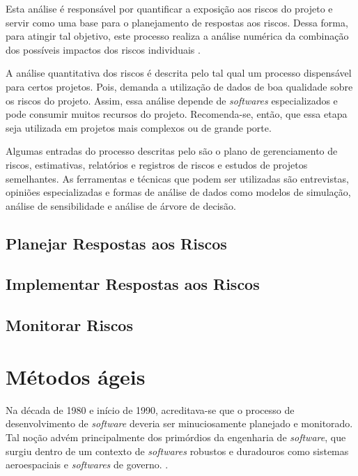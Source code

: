 \documentclass[
    12pt,       %
    openright,      %
    twoside,      %
    a4paper,      %
    english,      %
    french,       %
    spanish,      %
    brazil,       %
    ]{abntex2}
\begin{document}
Esta análise é responsável por quantificar a exposição aos riscos do projeto e servir como uma base para o planejamento de respostas aos riscos. Dessa forma, para atingir tal objetivo, este processo realiza a análise numérica da combinação dos possíveis impactos dos riscos individuais \cite{PMBOK:2017}.

A análise quantitativa dos riscos é descrita pelo  tal qual um processo dispensável para certos projetos. Pois, demanda a utilização de dados de boa qualidade sobre os riscos do projeto. Assim, essa análise depende de \textit{softwares} especializados e pode consumir muitos recursos do projeto. Recomenda-se, então, que essa etapa seja utilizada em projetos mais complexos ou de grande porte. 

Algumas entradas do processo descritas pelo 
são o plano de gerenciamento de riscos, estimativas, relatórios e registros de riscos e estudos de projetos semelhantes. As ferramentas e técnicas que podem ser utilizadas são entrevistas, opiniões especializadas e formas de análise de dados como modelos de simulação, análise de sensibilidade e análise de árvore de decisão. 

\subsection{Planejar Respostas aos Riscos}



\subsection{Implementar Respostas aos Riscos}
\subsection{Monitorar Riscos}

\section{Métodos ágeis}

Na década de 1980 e início de 1990, acreditava-se que o processo de desenvolvimento de \textit{software} deveria ser minuciosamente planejado e monitorado. Tal noção advém principalmente dos primórdios da engenharia de \textit{software}, que surgiu dentro de um contexto de \textit{softwares} robustos e duradouros como sistemas aeroespaciais e \textit{softwares} de governo. \cite{SOMMERVILLE:2011}.
\end{document}
